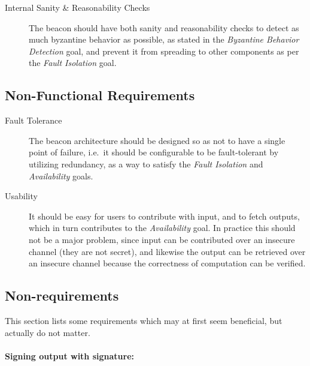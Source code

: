 \begin{description}
    
\item [Internal Sanity \& Reasonability Checks]
The beacon should have both sanity and reasonability checks to detect as much byzantine behavior as possible, as stated in the \emph{Byzantine Behavior Detection} goal, and prevent it from spreading to other components as per the \emph{Fault Isolation} goal. 

\end{description}

\subsection{Non-Functional Requirements}
\label{sub:non_functional_requirements}

\begin{description}
    \item[Fault Tolerance]
The beacon architecture should be designed so as not to have a single point of failure, i.e.\ it should be configurable to be fault-tolerant by utilizing redundancy, as a way to satisfy the \emph{Fault Isolation} and \emph{Availability} goals. 


    \item[Usability]
It should be easy for users to contribute with input, and to fetch outputs, which in turn contributes to the \emph{Availability} goal.
In practice this should not be a major problem, since input can be contributed over an insecure channel (they are not secret), and likewise the output can be retrieved over an insecure channel because the correctness of computation can be verified.
\end{description}

\subsection{Non-requirements}
This section lists some requirements which may at first seem beneficial, but actually do not matter.

\paragraph{Signing output with signature:}

